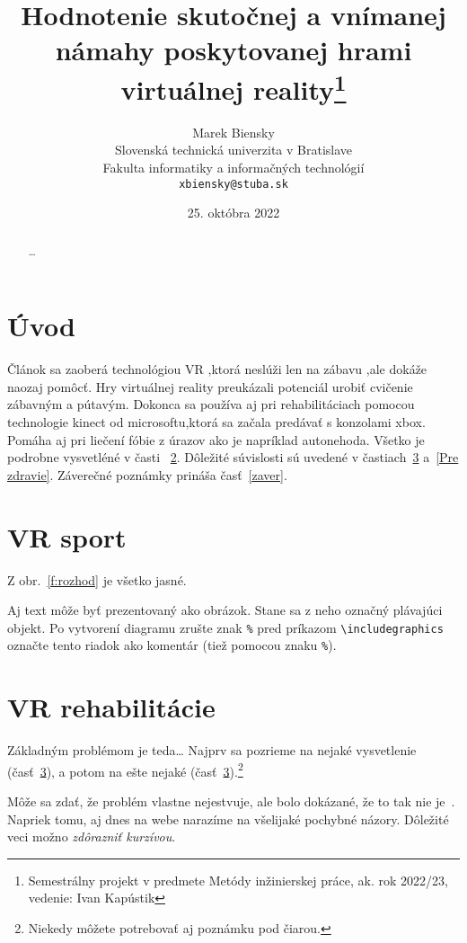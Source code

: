 \documentclass[10pt,twoside,slovak,a4paper]{article}
\title{Hodnotenie skutočnej a vnímanej námahy poskytovanej hrami virtuálnej reality\thanks{Semestrálny projekt v predmete Metódy inžinierskej práce, ak. rok 2022/23, vedenie: Ivan Kapústik}}
\author{Marek Biensky\\[2pt]
	{\small Slovenská technická univerzita v Bratislave}\\
	{\small Fakulta informatiky a informačných technológií}\\
	{\small \texttt{xbiensky@stuba.sk}}
	}
\date{\small 25. októbra 2022}
\begin{document}
\maketitle

\begin{abstract}
\ldots
\end{abstract}



\section{Úvod}
Článok sa zaoberá technológiou VR ,ktorá neslúži len na zábavu ,ale dokáže naozaj pomôcť.
Hry virtuálnej reality preukázali potenciál urobiť cvičenie zábavným a pútavým.
Dokonca sa používa aj pri rehabilitáciach pomocou technologie kinect od microsoftu,ktorá sa začala predávať s konzolami xbox.
Pomáha aj pri liečení fóbie z úrazov ako je napríklad autonehoda.
 Všetko je podrobne vysvetléné v časti ~\ref{VR sport}.
Dôležité súvislosti sú uvedené v častiach~\ref{VR rehabilitácie} a~\ref{Pre zdravie}.
Záverečné poznámky prináša časť~\ref{zaver}.



\section{VR sport} \label{VR sport}

Z obr.~\ref{f:rozhod} je všetko jasné. 

\begin{figure*}[tbh]
\centering
Aj text môže byť prezentovaný ako obrázok. Stane sa z neho označný plávajúci objekt. Po vytvorení diagramu zrušte znak \texttt{\%} pred príkazom \verb|\includegraphics| označte tento riadok ako komentár (tiež pomocou znaku \texttt{\%}).
\caption{Rozhodujúci argument.}
\label{f:rozhod}
\end{figure*}



\section{VR rehabilitácie} \label{VR rehabilitácie}

Základným problémom je teda\ldots{} Najprv sa pozrieme na nejaké vysvetlenie (časť~\ref{VR rehabilitácie}), a potom na ešte nejaké (časť~\ref{VR rehabilitácie}).\footnote{Niekedy môžete potrebovať aj poznámku pod čiarou.}

Môže sa zdať, že problém vlastne nejestvuje\cite{Coplien:MPD}, ale bolo dokázané, že to tak nie je~\cite{Czarnecki:Staged, Czarnecki:Progress}. Napriek tomu, aj dnes na webe narazíme na všelijaké pochybné názory\cite{PLP-Framework}. Dôležité veci možno \emph{zdôrazniť kurzívou}.
\end{document}
